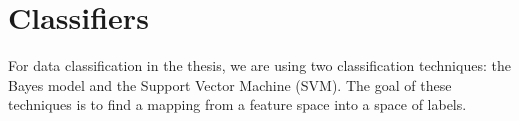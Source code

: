 \chapter{Classifiers}
For data classification in the thesis, we are using two classification techniques: the Bayes model and the Support Vector Machine (SVM). The goal of these techniques is to find a mapping from a feature space into a space of labels.






